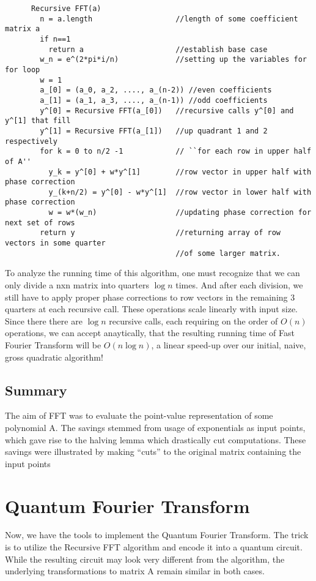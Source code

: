 \documentclass{article}
\begin{document}
    \begin{verbatim}
      Recursive FFT(a)
        n = a.length                   //length of some coefficient matrix a
        if n==1
          return a                     //establish base case
        w_n = e^(2*pi*i/n)             //setting up the variables for for loop
        w = 1
        a_[0] = (a_0, a_2, ...., a_(n-2)) //even coefficients
        a_[1] = (a_1, a_3, ...., a_(n-1)) //odd coefficients
        y^[0] = Recursive FFT(a_[0])   //recursive calls y^[0] and y^[1] that fill
        y^[1] = Recursive FFT(a_[1])   //up quadrant 1 and 2 respectively
        for k = 0 to n/2 -1            // ``for each row in upper half of A''
          y_k = y^[0] + w*y^[1]        //row vector in upper half with phase correction
          y_(k+n/2) = y^[0] - w*y^[1]  //row vector in lower half with phase correction
          w = w*(w_n)                  //updating phase correction for next set of rows
        return y                       //returning array of row vectors in some quarter
                                       //of some larger matrix.
    \end{verbatim}

    To analyze the running time of this algorithm, one must recognize that we
    can only divide a nxn matrix into quarters \(\log n\) times. And after each
    division, we still have to apply proper phase corrections to row vectors
    in the remaining 3 quarters at each recursive call. These operations scale
    linearly with input size. Since there there are \(\log n\) recursive calls,
    each requiring on the order of \(O(n)\) operations, we can accept anaytically,
    that the resulting running time of Fast Fourier Transform will be
    \(O(n\log n)\), a linear speed-up over our initial, naive, gross quadratic
    algorithm!


    \subsection{Summary}
    The aim of FFT was to evaluate the point-value representation of some polynomial A. The
    savings stemmed from usage of exponentials as input points, which gave rise to the halving
    lemma which drastically cut computations. These savings
    were illustrated by making ``cuts'' to the original matrix containing the input
    points
    \section{Quantum Fourier Transform}
    Now, we have the tools to implement the Quantum Fourier Transform. The trick is
    to utilize the Recursive FFT algorithm and encode it into a quantum circuit.
    While the resulting circuit may look very different from the algorithm, the
    underlying transformations to matrix A remain similar in both cases.
\end{document}
